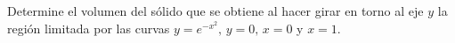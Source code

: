 \item Determine el volumen del sólido que se obtiene al hacer girar en torno al eje $y$ la región limitada por las curvas $y = e^{-x^2}, \, y = 0, \, x = 0$ y $x = 1$.
